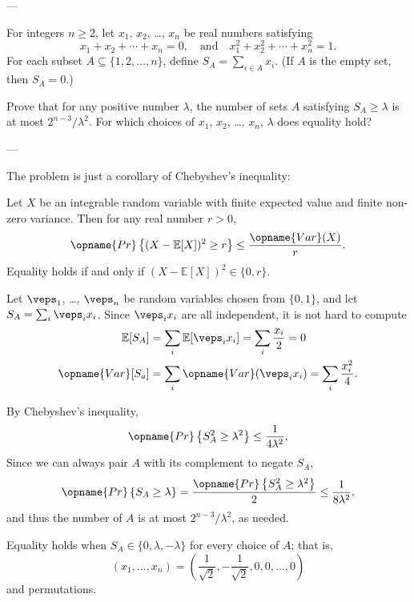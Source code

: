 
---

For integers $n\ge2$, let $x_1$, $x_2$, \ldots, $x_n$ be real numbers satisfying
\[x_1+x_2+\cdots+x_n=0,\quad\text{and}\quad x_1^2+x_2^2+\cdots+x_n^2=1.\]
For each subset $A\subseteq\{1,2,\ldots,n\}$, define
$S_A=\sum_{i\in A}x_i$.
(If $A$ is the empty set, then $S_A=0$.)

Prove that for any positive number $\lambda$, the number of sets $A$ satisfying $S_A\ge\lambda$ is at most $2^{n-3}/\lambda^2$. For which choices of $x_1$, $x_2$, \ldots, $x_n$, $\lambda$ does equality hold?

---

The problem is just a corollary of Chebyshev's inequality:
\begin{theorem*}[Chebyshev]
    Let $X$ be an integrable random variable with finite expected value and finite non-zero variance. Then for any real number $r>0$,
    \[\opname{Pr}\left\{(X-\mathbb E[X])^2\ge r\right\}\le\frac{\opname{Var}(X)}r.\]
    Equality holds if and only if $(X-\mathbb E[X])^2\in\{0,r\}$.
\end{theorem*}
Let $\veps_1$, \ldots, $\veps_n$ be random variables chosen from $\{0,1\}$, and let $S_A=\sum_i\veps_ix_i$. Since $\veps_ix_i$ are all independent, it is not hard to compute
\begin{align*}
    \mathbb E[S_A]&=\sum_i\mathbb E[\veps_ix_i]=\sum_i\frac{x_i}2=0\\
    \opname{Var}[S_a]&=\sum_i\opname{Var}(\veps_ix_i)=\sum_i\frac{x_i^2}4.
\end{align*}

By Chebyshev's inequality, \[\opname{Pr}\left\{S_A^2\ge\lambda^2\right\}\le\frac1{4\lambda^2},\]
Since we can always pair $A$ with its complement to negate $S_A$, \[\opname{Pr}\left\{S_A\ge\lambda\right\}=\frac{\opname{Pr}\left\{S_A^2\ge\lambda^2\right\}}2\le\frac1{8\lambda^2},\]
and thus the number of $A$ is at most $2^{n-3}/\lambda^2$, as needed.

Equality holds when $S_A\in\{0,\lambda,-\lambda\}$ for every choice of $A$; that is, \[(x_1,\ldots,x_n)=\left(\frac1{\sqrt2},-\frac1{\sqrt2},0,0,\ldots,0\right)\]
and permutations.

